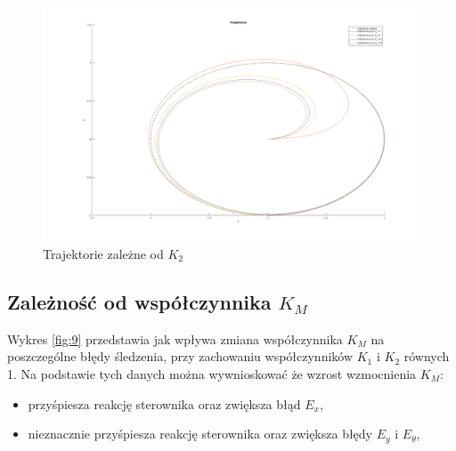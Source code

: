 \documentclass[12pt,a4paper]{article}
\begin{document}
  \begin{figure}[H]
    \centering
    \includegraphics[width=1\textwidth]{figures/dyn_trajektoria_k2.png}
    \caption{Trajektorie zależne od $K_2$}
    \label{fig:8}
  \end{figure}


  \subsection{Zależność od współczynnika $K_M$}
  Wykres \ref{fig:9} przedstawia jak wpływa zmiana współczynnika $K_M$ na poszczególne błędy śledzenia, przy zachowaniu współczynników $K_1$ i $K_2$ równych 1. Na podstawie tych danych można wywnioskować że wzrost wzmocnienia $K_M$:

  \begin{itemize}
    \item przyśpiesza reakcję sterownika oraz zwiększa błąd $E_x$,
    \item nieznacznie przyśpiesza reakcję sterownika oraz zwiększa błędy $E_y$ i $E_\theta$,
  \end{itemize}
  
\end{document}
